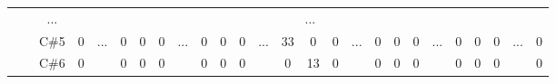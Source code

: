 \documentclass[12pt]{article}
\begin{document}
\begin{table}[!ht]
{\begin{tabular}{clcccccccccccccccccccccccc}
									& \multicolumn{1}{l|}{} & \multicolumn{1}{c|}{...}  & \multicolumn{23}{c|}{...}                                                                                                                                                                                                                                                                                                                                                                                                                                                                                                                                                                                                                                                                                                                         \\ \cline{3-4} \cline{6-8} \cline{10-12} \cline{14-16} \cline{18-20} \cline{22-24} \cline{26-26} 
									& \multicolumn{1}{l|}{} & \multicolumn{1}{c|}{C\#5} & \multicolumn{1}{c|}{0}    & \multicolumn{1}{c|}{\multirow{3}{*}{...}} & \multicolumn{1}{c|}{0}    & \multicolumn{1}{c|}{0}    & \multicolumn{1}{c|}{0}  & \multicolumn{1}{c|}{\multirow{3}{*}{...}} & \multicolumn{1}{c|}{0}  & \multicolumn{1}{c|}{0}  & \multicolumn{1}{c|}{0}  & \multicolumn{1}{c|}{\multirow{3}{*}{...}} & \multicolumn{1}{c|}{33}   & \multicolumn{1}{c|}{0}    & \multicolumn{1}{c|}{0}    & \multicolumn{1}{c|}{\multirow{3}{*}{...}} & \multicolumn{1}{c|}{0}  & \multicolumn{1}{c|}{0}  & \multicolumn{1}{c|}{0}    & \multicolumn{1}{c|}{\multirow{3}{*}{...}} & \multicolumn{1}{c|}{0}    & \multicolumn{1}{c|}{0}    & \multicolumn{1}{c|}{0}  & \multicolumn{1}{c|}{\multirow{3}{*}{...}} & \multicolumn{1}{c|}{0}  \\ \cline{3-4} \cline{6-8} \cline{10-12} \cline{14-16} \cline{18-20} \cline{22-24} \cline{26-26} 
									& \multicolumn{1}{l|}{} & \multicolumn{1}{c|}{C\#6} & \multicolumn{1}{c|}{0}    & \multicolumn{1}{c|}{}                     & \multicolumn{1}{c|}{0}    & \multicolumn{1}{c|}{0}    & \multicolumn{1}{c|}{0}  & \multicolumn{1}{c|}{}                     & \multicolumn{1}{c|}{0}  & \multicolumn{1}{c|}{0}  & \multicolumn{1}{c|}{0}  & \multicolumn{1}{c|}{}                     & \multicolumn{1}{c|}{0}    & \multicolumn{1}{c|}{13}   & \multicolumn{1}{c|}{0}    & \multicolumn{1}{c|}{}                     & \multicolumn{1}{c|}{0}  & \multicolumn{1}{c|}{0}  & \multicolumn{1}{c|}{0}    & \multicolumn{1}{c|}{}                     & \multicolumn{1}{c|}{0}    & \multicolumn{1}{c|}{0}    & \multicolumn{1}{c|}{0}  & \multicolumn{1}{c|}{}                     & \multicolumn{1}{c|}{0}  \\ \cline{3-4} \cline{6-8} \cline{10-12} \cline{14-16} \cline{18-20} \cline{22-24} \cline{26-26} 

\end{tabular}}
\end{table}
\end{document}

